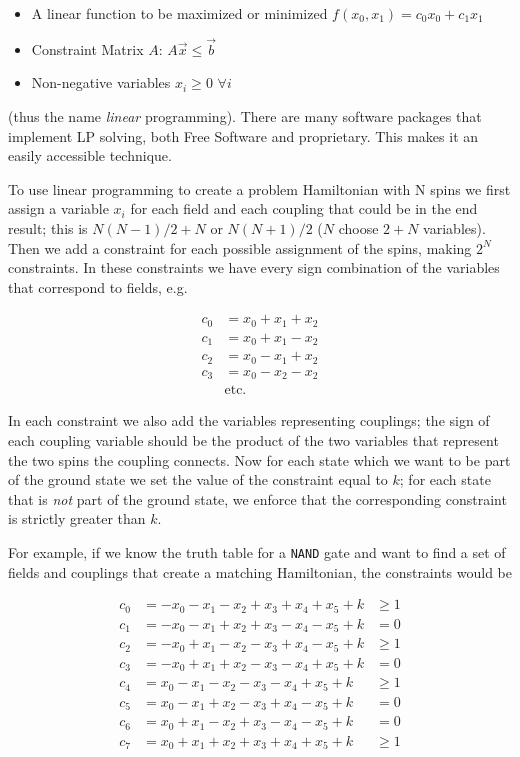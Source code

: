 \begin{itemize}
	\item A linear function to be maximized or minimized
		\subitem $f(x_0,x_1) = c_0x_0 + c_1x_1$
	\item Constraint Matrix $A$:
		\subitem $A\vec{x} \le \vec{b} $
	\item Non-negative variables
		\subitem $x_i \ge 0$ $\forall i$
\end{itemize}


(thus the name \emph{linear} programming).  There are many software packages that implement LP solving, both Free Software and proprietary.  This makes it an easily accessible technique.

To use linear programming to create a problem Hamiltonian with N spins we first assign a variable $x_i$ for each field and each coupling that could be in the end result; this is $N(N-1)/2 + N$ or $N(N + 1)/2$ ($N$ choose $2 + N$ variables).  Then we add a constraint for each possible assignment of the spins, making $2^N$ constraints.  In these constraints we have every sign combination of the variables that correspond to fields, e.g.

\begin{align}
	 c_0 &  = x_0 + x_1 + x_2 \nonumber \\ 
	 c_1 & = x_0 + x_1 - x_2 \nonumber \\ 
	 c_2 & = x_0 - x_1 + x_2 \nonumber \\
	 c_3 & = x_0 - x_2 - x_2 \\
		 & \mathrm{etc.} \nonumber
\end{align}

In each constraint we also add the variables representing couplings; the sign of each coupling variable should be the product of the two variables that represent the two spins the coupling connects.  Now for each state which we want to be part of the ground state we set the value of the constraint equal to $k$; for each state that is \emph{not} part of the ground state, we enforce that the corresponding constraint is strictly greater than $k$.  

For example, if we know the truth table for a \texttt{NAND} gate and want to find a set of fields and couplings that create a matching Hamiltonian, the constraints would be

\begin{align}
	c_0 &= -x_0 - x_1 - x_2 + x_3 + x_4 + x_5 + k &\ge 1 \nonumber\\
	c_1 &= -x_0 - x_1 + x_2 + x_3 - x_4 - x_5 + k &= 0 \nonumber\\
	c_2 &= -x_0 + x_1 - x_2 - x_3 + x_4 - x_5 + k &\ge 1 \nonumber\\
	c_3 &= -x_0 + x_1 + x_2 - x_3 - x_4 + x_5 + k &= 0 \nonumber\\
	c_4 &= x_0 - x_1 - x_2 - x_3 - x_4 + x_5 + k &\ge 1 \nonumber\\
	c_5 &= x_0 - x_1 + x_2 - x_3 + x_4 - x_5 + k &= 0 \nonumber\\
	c_6 &= x_0 + x_1 - x_2 + x_3 - x_4 - x_5 + k &= 0 \nonumber\\
	c_7 &= x_0 + x_1 + x_2 + x_3 + x_4 + x_5 + k &\ge 1 
\end{align}

